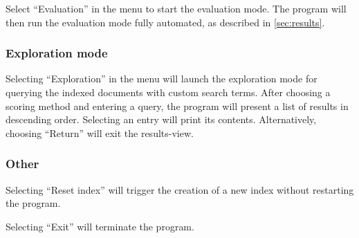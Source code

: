 Select \enquote{Evaluation} in the menu to start the evaluation mode.
The program will then run the evaluation mode fully automated, as described in \autoref{sec:results}.

\subsubsection{Exploration mode}

Selecting \enquote{Exploration} in the menu will launch the exploration mode for querying the indexed documents with custom search terms.
After choosing a scoring method and entering a query, the program will present a list of results in descending order.
Selecting an entry will print its contents.
Alternatively, choosing \enquote{Return} will exit the results-view.

\subsubsection{Other}

Selecting \enquote{Reset index} will trigger the creation of a new index without restarting the program.

Selecting \enquote{Exit} will terminate the program.
